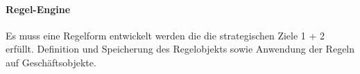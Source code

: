 %
\paragraph*{Regel-Engine}
Es muss eine Regelform entwickelt werden die die strategischen Ziele 1 + 2 erfüllt.
Definition und Speicherung des Regelobjekts sowie Anwendung der Regeln auf Geschäftsobjekte.


\begin{comment}
%
\section{Marktzugang}
\paragraph*{Direkt}
Ein Integration in einen bestehenden Prozess einer Firma könnte schwierig sein wenn Firmen dieses Projekt als zu fragmentiert ansehen und lieber Lösungen "aus einer Hand" haben wollen.
%
\paragraph*{Partner}
Beim Marktzugang über Partner wie DMS Hersteller und Systemhäuser könnte die \brand Kernfunktionalität der Attributierung nicht als Mehrwert schaffende Zusatzkomponente angesehen werden.
%
\section{Fachlich}
Firmeninterne oder gesetzliche Regeln zur Dokumentenverarbeitung könnten den Verwaltungsaufwand der einen Attrbutierungsprozess umgibt 
unvorhergesehen erhöhen.
\end{comment}

